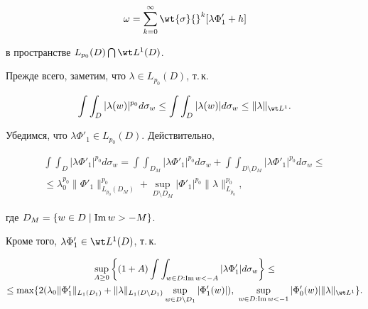 \begin{pf}
\begin{equation}
\omega = \sum_{k = 0}^{\infty} \wt{\sigma}{}^k [\lambda \Phi'_1 + h]


\end{equation}


в пространстве $L_{p_0}(D) \bigcap \wt L^1 (D)$.





Прежде всего, заметим, что $\lambda \in L_{p_0} (D)$, т.\,к.


$$


\int\int_{D} |\lambda(w)|^{p_0} d\sigma_w \leq


\int\int_{D} |\lambda(w)| d\sigma_w \leq


\|\lambda\|_{\wt L^1}.


$$


Убедимся, что $\lambda \Phi'_1 \in L_{p_0} (D)$. Действительно,


\begin{multline*}


\int\int_{D} |\lambda \Phi'_1|^{p_0} d\sigma_w =


\int\int_{D_M} |\lambda \Phi'_1|^{p_0} d\sigma_w +


\int\int_{D \setminus D_M} |\lambda \Phi'_1|^{p_0} d\sigma_w\leq \\


%


\leq \lambda_0^{p_0} \|\Phi'_1\|_{L_{p_0} (D_M)}^{p_0}


+ \sup_{D \setminus D_M} |\Phi'_1|^{p_0} \|\lambda\|_{L_{p_0}}^{p_0},


\end{multline*}


где $D_M = \{w \in D \mid \operatorname{Im} w > - M \}$.


Кроме того, $\lambda \Phi'_1 \in \wt L^1(D)$, т.\,к.


\begin{multline*}


\sup_{A \geq 0} \bigg\{ (1 + A) \int\int_{w \in D: \im w < -A} |\lambda


\Phi'_1| d\sigma_w \bigg\} \leq \\


\le \max \{2(\lambda_0 \|\Phi'_1\|_{L_1(D_1)} +


\|\lambda\|_{L_1(D \setminus D_1)} \sup_{w \in D \setminus D_1}


|\Phi'_1(w)|),\ \sup_{w \in D: \im w < -1} |\Phi'_0(w)|


\|\lambda\|_{\wt L^1} \}.


\end{multline*}



\end{pf}
